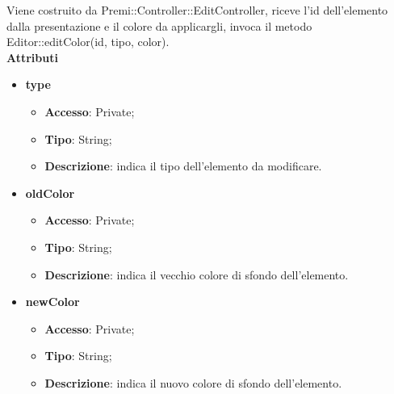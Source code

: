 {{{		\indent Viene costruito da Premi::Controller::EditController, riceve l’id dell’elemento dalla presentazione e il colore da applicargli, invoca il metodo Editor::editColor(id, tipo, color).\\
	\textbf{Attributi}
	\begin{itemize}
		\item \textbf{type}
		\begin{itemize}
			\item \textbf{Accesso}: Private;
			\item \textbf{Tipo}: String;
			\item \textbf{Descrizione}: indica il tipo dell’elemento da modificare.
		\end{itemize}
		\item \textbf{oldColor}
		\begin{itemize}
			\item \textbf{Accesso}: Private;
			\item \textbf{Tipo}: String;
			\item \textbf{Descrizione}: indica il vecchio colore di sfondo dell’elemento.
		\end{itemize}
		\item \textbf{newColor}
		\begin{itemize}
			\item \textbf{Accesso}: Private;
			\item \textbf{Tipo}: String;
			\item \textbf{Descrizione}: indica il nuovo colore di sfondo dell’elemento.
		\end{itemize}
	\end{itemize}
	
}}}
